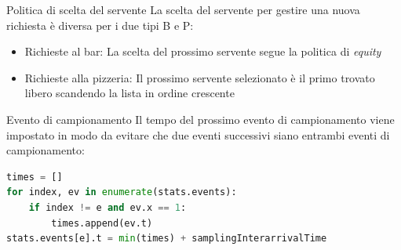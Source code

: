 \documentclass[xcolor=table]{beamer}
\newcommand{\key}[1]{\texttt{\StrSubstitute{#1}{_}{\_}}}
\begin{document}
\begin{frame}{Politica di scelta del servente}\justifying
La scelta del servente per gestire una nuova richiesta è diversa per i due tipi B e P:
\begin{itemize}
\item Richieste al bar: La scelta del prossimo servente segue la politica di \textit{equity}
\item Richieste alla pizzeria: Il prossimo servente selezionato è il primo trovato libero scandendo la lista in ordine crescente
\end{itemize}
\end{frame}

\begin{frame}[fragile]{Evento di campionamento}
\justifying
Il tempo del prossimo evento di campionamento viene impostato in modo da evitare che due eventi successivi siano entrambi eventi di campionamento:

\begin{lstlisting}[language=Python, firstnumber=242, title=\key{simulation.py}, tabsize=3,framexleftmargin={\dimexpr 1.5em+15pt}, xleftmargin={\dimexpr 1.5em+15pt},]
times = []
for index, ev in enumerate(stats.events):
	if index != e and ev.x == 1:
		times.append(ev.t)
stats.events[e].t = min(times) + samplingInterarrivalTime
\end{lstlisting}
\end{frame}
\end{document}
